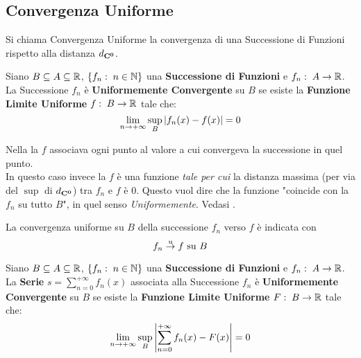 \subsection{Convergenza Uniforme}\label{sect:conv_unif}
Si chiama Convergenza Uniforme la convergenza di una Successione di Funzioni rispetto alla distanza $d_{\mathbf{C^{0}}}$.

\begin{definition}
	\label{def:succ_unif_conv}
	Siano $B \subseteq A \subseteq \mathbb{R}$, $\left\{f_n:\; n \in \mathbb{N}\right\}$ una \textbf{Successione di Funzioni} e $f_n:\; A \to \mathbb{R}$.\\
	La Successione $f_n$ è \textbf{Uniformemente Convergente} su $B$ se esiste la \textbf{Funzione Limite Uniforme} $f:\; B \to \mathbb{R}$ tale che:
	\[\lim\limits_{n \to +\infty} \sup\limits_{B} \left|f_n(x) - f(x)\right| = 0\]
	\begin{note}
		Nella  la $f$ associava ogni punto al valore a cui convergeva la successione in quel punto.\\
		In questo caso invece la $f$ è una funzione \textit{tale per cui} la distanza massima (per via del $\sup$ di $d_{\mathbf{C^{0}}}$) tra $f_n$ e $f$ è $0$. Questo vuol dire che la funzione "coincide con la $f_n$ su tutto $B$", in quel senso \textit{Uniformemente}. Vedasi .
	\end{note}
	La convergenza uniforme su $B$ della successione $f_n$ verso $f$ è indicata con
	\[f_n \overset{\text{u}}{\to} f \text{ su } B\]
\end{definition}
\begin{definition}
	Siano $B \subseteq A \subseteq \mathbb{R}$, $\left\{f_n:\; n \in \mathbb{N}\right\}$ una \textbf{Successione di Funzioni} e $f_n:\; A \to \mathbb{R}$.\\
	La \textbf{Serie} $s = \sum\limits_{n = 0}^{+\infty} f_n(x)$ associata alla Successione $f_n$ è \textbf{Uniformemente Convergente} su $B$ se esiste la \textbf{Funzione Limite Uniforme} $F:\; B \to \mathbb{R}$ tale che:
	\[\lim\limits_{n \to +\infty} \sup\limits_{B} \left|\sum\limits_{n = 0}^{+\infty} f_n(x) - F(x)\right| = 0\]
\end{definition}

